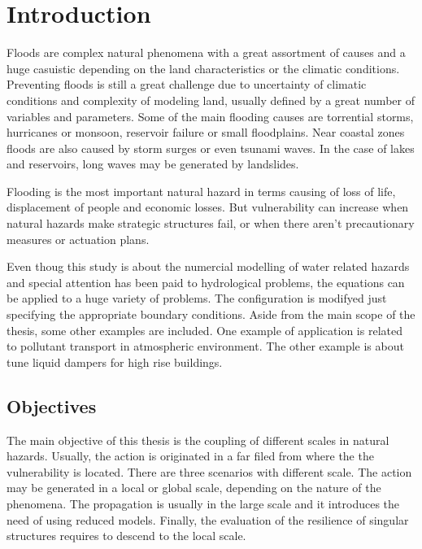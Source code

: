 
\chapter{Introduction}
\label{chapter_introduction}

Floods are complex natural phenomena with a great assortment of causes and a huge casuistic
depending on the land characteristics or the climatic conditions. Preventing floods is still a great
challenge due to uncertainty of climatic conditions and complexity of modeling land, usually
defined by a great number of variables and parameters.
Some of the main flooding causes are torrential storms, hurricanes or monsoon, reservoir failure
or small floodplains. Near coastal zones floods are also caused by storm surges or even
tsunami waves. In the case of lakes and reservoirs, long waves may be generated by landslides.

Flooding is the most important natural hazard in terms causing of loss of life, displacement of
people and economic losses. But vulnerability can
increase when natural hazards make strategic structures fail, or when there aren't precautionary
measures or actuation plans.



Even thoug this study is about the numercial modelling of water related hazards and special attention has been paid to hydrological problems, the equations can be applied to a huge variety of problems. The configuration is modifyed just specifying the appropriate boundary conditions. Aside from the main scope of the thesis, some other examples are included. One example of application is related to pollutant transport in atmospheric environment. The other example is about tune liquid dampers for high rise buildings.



\section{Objectives} 

The main objective of this thesis is the coupling of different scales in natural hazards. Usually, the action is originated in a far filed from where the the vulnerability is located. There are three scenarios with different scale. The action may be generated in a local or global scale, depending on the nature of the phenomena. The propagation is usually in the large scale and it introduces the need of using reduced models. Finally, the evaluation of the resilience of singular structures requires to descend to the local scale.

